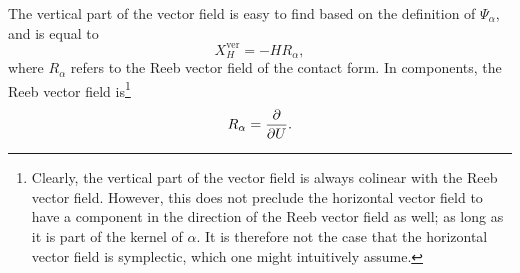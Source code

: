 The vertical part of the vector field is easy to find based on the definition of $\Psi_\alpha$, and is equal to
\begin{equation}
    X_H^\text{ver} = - H R_\alpha, 
    \label{eq:vertical_vf}
\end{equation}
where $R_\alpha$ refers to the Reeb vector field of the contact form. In components, the Reeb vector field is\footnote
{
    Clearly, the vertical part of the vector field is always colinear with the Reeb vector field. However, this does not preclude the horizontal vector field to have a component in the direction of the Reeb vector field as well; as long as it is part of the kernel of $\alpha$. It is therefore not the case that the horizontal vector field is symplectic, which one might intuitively assume.
}
$$ 
    R_\alpha = \pdv{}{U}.
$$ 

